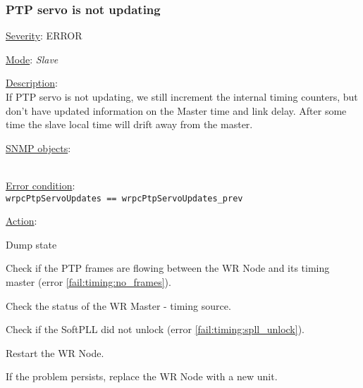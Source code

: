 \subsubsection{\bf PTP servo is not updating}
		\label{fail:timing:servo_not_updating}
		\begin{pck_descr}
			\item [] \underline{Severity}: ERROR
			\item [] \underline{Mode}: \emph{Slave}
			\item [] \underline{Description}:\\
				If PTP servo is not updating, we still increment the internal timing
				counters, but don't have updated information on the Master time and link
				delay. After some time the slave local time will drift away from the
				master.
			\item [] \underline{SNMP objects}:\\
				{\footnotesize
				\\
				 }
			\item [] \underline{Error condition}:\\
				{\footnotesize
				\texttt{wrpcPtpServoUpdates == wrpcPtpServoUpdates\_prev} }
      \item [] \underline{Action}:
        \begin{pck_proc}
        \item Dump state
        \item Check if the PTP frames are flowing between the WR Node and its
          timing master (error \ref{fail:timing:no_frames}).
        \item Check the status of the WR Master - timing source.
        \item Check if the SoftPLL did not unlock (error
          \ref{fail:timing:spll_unlock}).
        \item Restart the WR Node.
        \item If the problem persists, replace the WR Node with a new unit.
        \end{pck_proc}
		\end{pck_descr}


